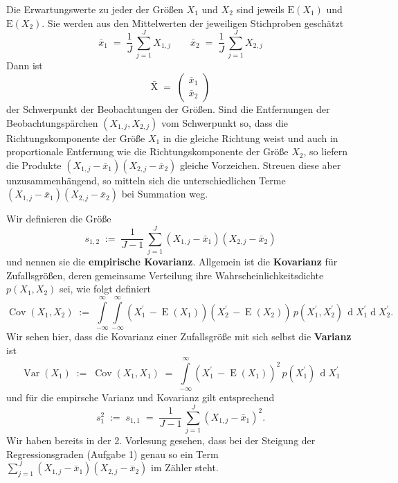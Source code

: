 Die Erwartungswerte zu jeder der Größen $X_1$ und $X_2$ sind jeweils
$\mathrm{E}(X_1)$ und $\mathrm{E}(X_2)$. Sie werden aus den Mittelwerten der jeweiligen
Stichproben geschätzt
\begin{equation}
\bar x_1 \; = \; \frac{1}{J} \, \sum_{j = 1}^J X_{1,j} \qquad
\bar x_2 \; = \; \frac{1}{J} \, \sum_{j = 1}^J X_{2,j}
\end{equation}
Dann ist
\begin{equation}
\mathrm{\bar X} \; = \;
\left(\begin{array}{c}
\bar x_1 \\
\bar x_2
\end{array}
\right)
\end{equation}
der Schwerpunkt der Beobachtungen der Größen.
Sind die Entfernungen der Beobachtungs\-pärchen $(X_{1,j}, X_{2,j})$ vom Schwerpunkt so,
dass die Richtungskomponente der Größe $X_1$ in die gleiche Richtung weist und auch in
proportionale Entfernung wie die Richtungskomponente der Größe $X_2$, so liefern die 
Produkte $(X_{1,j} - \bar x_1)(X_{2,j} - \bar x_2)$ gleiche Vorzeichen. Streuen diese
aber unzusammenhängend, so mitteln sich die unterschiedlichen Terme
$(X_{1,j} - \bar x_1)(X_{2,j} - \bar x_2)$ bei Summation weg.

Wir definieren die Größe
\begin{equation}
s_{1,2} \; := \; \frac{1}{J-1} \, \sum_{j = 1}^J (X_{1,j} - \bar x_1)(X_{2,j} - \bar x_2)
\end{equation}
und nennen sie die \textbf{empirische Kovarianz}.
Allgemein ist die \textbf{Kovarianz} für Zufallsgrößen, deren gemeinsame Verteilung
ihre Wahrscheinlichkeitsdichte $p(X_1, X_2)$ sei, wie folgt definiert
\begin{equation}
\operatorname{Cov}(X_1, X_2) \; := \; 
\int\limits_{-\infty}^{\infty}\int\limits_{-\infty}^{\infty}
(X_1^\prime \, - \operatorname{E}(X_1))(X_2^\prime \, - \operatorname{E}(X_2)) \,
p(X_1^\prime, X_2^\prime) \, \operatorname{d} X_1^\prime \operatorname{d} X_2^\prime .
\end{equation}
Wir sehen hier, dass die Kovarianz einer Zufallsgröße mit sich selbst die
\textbf{Varianz} ist
\begin{equation}
\operatorname{Var}(X_1) \; := \;  \operatorname{Cov}(X_1, X_1) \; = \; 
\int\limits_{-\infty}^{\infty}
(X_1^\prime \, - \operatorname{E}(X_1))^2 \,
p(X_1^\prime) \, \operatorname{d} X_1^\prime
\end{equation}
und für die empirsche Varianz und Kovarianz gilt entsprechend
\begin{equation}
s_{1}^2 \; := \; s_{1,1} \; = \; 
\frac{1}{J-1} \, \sum_{j = 1}^J (X_{1,j} - \bar x_1)^2 .
\end{equation}
Wir haben bereits in der 2. Vorlesung gesehen, dass bei der Steigung der Regressionsgraden
(Aufgabe 1) genau so ein Term $\sum_{j = 1}^J (X_{1,j} - \bar x_1)(X_{2,j} - \bar x_2)$
im Zähler steht.

